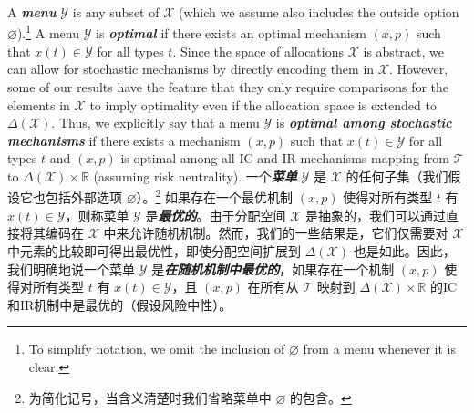 \documentclass[12pt,letterpaper]{article}
\newenvironment{original}{\color{black}\noindent}{}
\newenvironment{translation}{\color{blue}\noindent}{}
\theoremstyle{plain}
\theoremstyle{definition}
\theoremstyle{remark}
\let\emptyset\varnothing
\newcommand{\R}{\mathds{R}}
\renewcommand{\1}{\mathds{1}}
\theoremstyle{definition}
\begin{document}
\begin{original}
A \textit{\textbf{menu}} $\mathcal{Y}$ is any subset of $\mathcal{X}$ (which we assume also includes the outside option $\varnothing$).\footnote{To simplify notation, we omit the inclusion of $\emptyset$ from a menu whenever it is clear.}
A menu $\mathcal{Y}$ is \textit{\textbf{optimal}} if there exists an optimal mechanism $(x, p)$ such that $x(t) \in \mathcal{Y}$ for all types $t$. Since the space of allocations $\mathcal{X}$ is abstract, we can allow for stochastic mechanisms by directly encoding them in $\mathcal{X}$. However, some of our results have the feature that they only require comparisons for the elements in $\mathcal{X}$ to imply optimality even if the allocation space is extended to $\Delta(\mathcal{X})$. Thus, we explicitly say that a menu $\mathcal{Y}$ is \textit{\textbf{optimal among stochastic mechanisms}} if there exists a mechanism $(x, p)$ such that $x(t) \in \mathcal{Y}$ for all types $t$ and $(x, p)$ is optimal among all IC and IR mechanisms mapping from $\mathcal{T}$ to $\Delta(\mathcal{X}) \times \R$ (assuming risk neutrality).
\end{original}
\begin{translation}
一个\textit{\textbf{菜单}} $\mathcal{Y}$ 是 $\mathcal{X}$ 的任何子集（我们假设它也包括外部选项 $\varnothing$）。\footnote{为简化记号，当含义清楚时我们省略菜单中 $\emptyset$ 的包含。}
如果存在一个最优机制 $(x, p)$ 使得对所有类型 $t$ 有 $x(t) \in \mathcal{Y}$，则称菜单 $\mathcal{Y}$ 是\textit{\textbf{最优的}}。由于分配空间 $\mathcal{X}$ 是抽象的，我们可以通过直接将其编码在 $\mathcal{X}$ 中来允许随机机制。然而，我们的一些结果是，它们仅需要对 $\mathcal{X}$ 中元素的比较即可得出最优性，即使分配空间扩展到 $\Delta(\mathcal{X})$ 也是如此。因此，我们明确地说一个菜单 $\mathcal{Y}$ 是\textit{\textbf{在随机机制中最优的}}，如果存在一个机制 $(x, p)$ 使得对所有类型 $t$ 有 $x(t) \in \mathcal{Y}$，且 $(x, p)$ 在所有从 $\mathcal{T}$ 映射到 $\Delta(\mathcal{X}) \times \R$ 的IC和IR机制中是最优的（假设风险中性）。
\end{translation}
\end{document}
